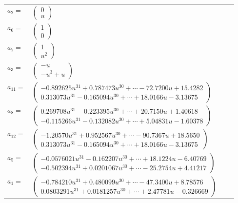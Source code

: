\documentclass[1p]{elsarticle_modified}
\theoremstyle{definition}
\begin{document}
\begin{tabular}{m{7pt} m{180pt} m{7pt} m{180pt} }
\flushright $a_{2}=$&$\begin{pmatrix}0\\u\end{pmatrix}$ \\
\flushright $a_{6}=$&$\begin{pmatrix}1\\0\end{pmatrix}$ \\
\flushright $a_{7}=$&$\begin{pmatrix}1\\u^2\end{pmatrix}$ \\
\flushright $a_{3}=$&$\begin{pmatrix}- u\\- u^3+u\end{pmatrix}$ \\
\flushright $a_{11}=$&$\begin{pmatrix}-0.892625 u^{31}+0.787473 u^{30}+\cdots-72.7200 u+15.4282\\0.313073 u^{31}-0.165094 u^{30}+\cdots+18.0166 u-3.13675\end{pmatrix}$ \\
\flushright $a_{8}=$&$\begin{pmatrix}0.269708 u^{31}-0.223395 u^{30}+\cdots+20.7150 u+1.40618\\-0.115266 u^{31}-0.132082 u^{30}+\cdots+5.04831 u-1.60378\end{pmatrix}$ \\
\flushright $a_{12}=$&$\begin{pmatrix}-1.20570 u^{31}+0.952567 u^{30}+\cdots-90.7367 u+18.5650\\0.313073 u^{31}-0.165094 u^{30}+\cdots+18.0166 u-3.13675\end{pmatrix}$ \\
\flushright $a_{5}=$&$\begin{pmatrix}-0.0576021 u^{31}-0.162207 u^{30}+\cdots+18.1224 u-6.40769\\-0.502394 u^{31}+0.0201067 u^{30}+\cdots-25.2754 u+4.41217\end{pmatrix}$ \\
\flushright $a_{1}=$&$\begin{pmatrix}-0.784210 u^{31}+0.480099 u^{30}+\cdots-47.3400 u+8.78576\\0.0803291 u^{31}+0.0181257 u^{30}+\cdots+2.47781 u-0.326669\end{pmatrix}$ \\

\end{tabular}
\end{document}
